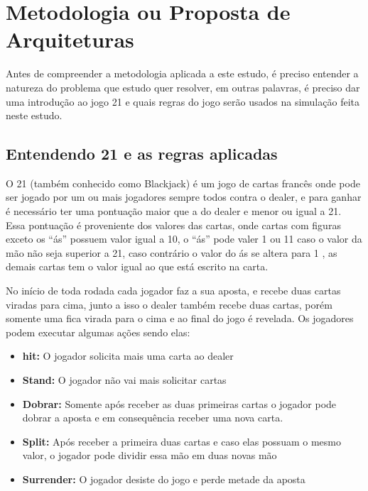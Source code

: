 \section{Metodologia ou Proposta de Arquiteturas}

    Antes de compreender a metodologia aplicada a este estudo, é preciso entender
    a natureza do problema que estudo quer resolver, em outras palavras, é preciso 
    dar uma introdução ao jogo 21 e quais regras do jogo serão usados na simulação 
    feita neste estudo.

\subsection{Entendendo 21 e as regras aplicadas}

    O 21\cite{blackjack-wikipedia} (também conhecido como Blackjack) é um jogo de cartas francês onde pode ser 
    jogado por um ou mais jogadores sempre todos contra o dealer, e para ganhar 
    é necessário ter uma pontuação maior que a do dealer e menor ou igual a 21.
    Essa pontuação é proveniente dos valores das cartas, onde cartas com figuras exceto os “ás” 
    possuem valor igual a 10, o “ás” pode valer 1 ou 11 caso o valor da mão não
    seja superior a 21, caso contrário o valor do ás se altera para 1 , as demais 
    cartas tem o valor igual ao que está escrito na carta. 

    No início de toda rodada cada jogador faz a sua aposta, e recebe duas 
    cartas viradas para cima, junto a isso o dealer também recebe duas cartas,
    porém somente uma fica virada para o cima e ao final do jogo é revelada. 
    Os jogadores podem executar algumas ações\cite{blackjack-pokerstars} sendo elas:
\begin{itemize}
    \item \textbf{hit:} O jogador solicita mais uma carta ao dealer  
    \item \textbf{Stand:} O jogador não vai mais solicitar cartas 
    \item \textbf{Dobrar:} Somente após receber as duas primeiras cartas o 
    jogador pode dobrar a aposta e em consequência receber uma nova carta.
    \item \textbf{Split:} Após receber a primeira duas cartas e caso elas 
    possuam o mesmo valor, o jogador pode dividir essa mão em duas novas mão
    \item \textbf{Surrender:}  O jogador desiste do jogo e perde metade da aposta  
\end{itemize}

